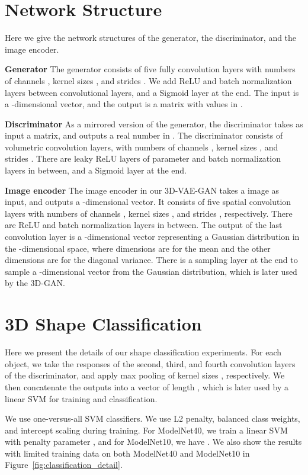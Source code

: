 \documentclass{article}
\newcommand{\fig}[1]{Figure~\ref{#1}}
\newcommand{\model}{3D-GAN\xspace}
\newcommand{\vaemodel}{3D-VAE-GAN\xspace}
\begin{document}
\section{Network Structure}
Here we give the network structures of the generator, the discriminator, and the image encoder. 

{\bf Generator} The generator consists of five fully convolution layers with numbers of channels , kernel sizes , and strides . We add ReLU and batch normalization layers between convolutional layers, and a Sigmoid layer at the end. 
The input is a -dimensional vector, and the output is a  matrix with values in .     

{\bf Discriminator} As a mirrored version of the generator, the discriminator takes as input a  matrix, and outputs a real number in . The discriminator consists of  volumetric convolution layers, with numbers of channels , kernel sizes , and strides . There are leaky ReLU layers of parameter  and batch normalization layers in between, and a Sigmoid layer at the end. 

{\bf Image encoder} The image encoder in our \vaemodel takes a  image as input, and outputs a -dimensional vector. It consists of five spatial convolution layers with numbers of channels , kernel sizes , and strides , respectively. There are ReLU and batch normalization layers in between. The output of the last convolution layer is a -dimensional vector representing a Gaussian distribution in the -dimensional space, where  dimensions are for the mean and the other  dimensions are for the diagonal variance. There is a sampling layer at the end to sample a -dimensional vector from the Gaussian distribution, which is later used by the \model. 

\section{3D Shape Classification}

Here we present the details of our shape classification experiments. For each object, we take the responses of the second, third, and fourth convolution layers of the discriminator, and apply max pooling of kernel sizes , respectively. We then concatenate the outputs into a vector of length , which is later used by a linear SVM for training and classification. 

We use one-versus-all SVM classifiers. We use L2 penalty, balanced class weights, and intercept scaling during training. For ModelNet40, we train a linear SVM with penalty parameter , and for ModelNet10, we have . We also show the results with limited training data on both ModelNet40 and ModelNet10 in \fig{fig:classification_detail}.
\end{document}
